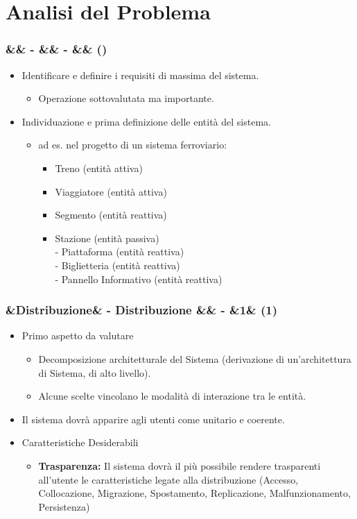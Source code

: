 \documentclass[slidestop,compress,blackandwhite]{beamer}
\newcommand{\itemB}[3]{
	\item \textbf{#1} #2 \vspace{#3}
}
\newcommand{\cm}[1]{\vspace{#1cm}}
\newcommand{\newtitle}[4]{
	#1 
	\ifx&#2&%
	\else
  		\large- #2
	\fi
	\ifx&#3&%
	\else
  		\normalsize- #3
	\fi
	\ifx&#4&%
	\else
  		\normalsize (#4)
	\fi
}
\newcommand{\newframe}[5]{
	\begin{frame}
		\frametitle{\newtitle{#1}{#2}{#3}{#4}}
		#5
	\end{frame}
}
\newcommand{\myitemize}[1]{
	\begin{itemize}\itemsep4pt
	#1
	\end{itemize}
}
\begin{document}
\section{Analisi del Problema}\label{analisis}
	\newframe{}{}{}{}{
		\myitemize {
			\item Identificare e definire i requisiti di massima del sistema.
				\myitemize{
					\item Operazione sottovalutata ma importante.
				}
			\item Individuazione e prima definizione delle entità del sistema.
				\myitemize {
					\item ad es. nel progetto di un sistema ferroviario:
						\myitemize{
							\item Treno (entità attiva)
							\item Viaggiatore (entità attiva)
							\item Segmento (entità reattiva)
							\item Stazione (entità passiva)\\\cm{0.1}
								- Piattaforma (entità reattiva)\\ \cm{0.1}
								- Biglietteria (entità reattiva)\\ \cm{0.1}
								- Pannello Informativo (entità reattiva)
							
						}
				}
		}
	}
	
	\newframe{}{Distribuzione}{}{1}{
		\myitemize {
			\item Primo aspetto da valutare
				\myitemize {
					\item Decomposizione architetturale del Sistema (derivazione di un'architettura di Sistema, di alto livello).
					\item Alcune scelte vincolano le modalità di interazione tra le entità.
				}
			
			\item \justifying Il sistema dovrà apparire agli utenti come unitario e coerente. 
				
			\item Caratteristiche Desiderabili
				\myitemize {
					\itemB{Trasparenza:}{Il sistema dovrà il più possibile rendere trasparenti all'utente le caratteristiche legate alla distribuzione (Accesso, Collocazione, Migrazione, Spostamento, Replicazione, Malfunzionamento, Persistenza)}{0.1cm}
				}
		}
	}
	
\end{document}
